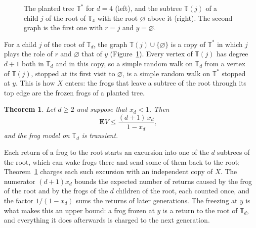 \documentclass[11pt]{amsart}
\newtheorem{theorem}{Theorem}[section]
\theoremstyle{definition}
\numberwithin{equation}{section}
\newcommand{\lean}[1]{\ignorespaces}
\newcommand{\T}{\mathbb{T}}
\newcommand{\Ts}{\mathbb{T}^{*}}
\newcommand{\E}{\mathbf{E}}
\begin{document}
\begin{figure}[ht]
\caption{The planted tree $\Ts$ for $d=4$ (left), and the subtree $\T(j)$ of a child $j$ of the root of $\T_4$ with the root $\varnothing$ above it (right). The second graph is the first one with $r=j$ and $y=\varnothing$.}\label{fig:planted}
\end{figure}

For a child $j$ of the root of $\T_d$, the graph $\T(j)\cup\{\varnothing\}$ is a copy of $\Ts$ in which $j$ plays the role of $r$ and $\varnothing$ that of $y$ (Figure~\ref{fig:planted}). Every vertex of $\T(j)$ has degree $d+1$ both in $\T_d$ and in this copy, so a simple random walk on $\T_d$ from a vertex of $\T(j)$, stopped at its first visit to $\varnothing$, is a simple random walk on $\Ts$ stopped at $y$. This is how $X$ enters: the frogs that leave a subtree of the root through its top edge are the frozen frogs of a planted tree.

\begin{theorem}\label{thm:A}\lean{FrogModel.theoremA, FrogModel.transient_of_meanX_lt_one, FrogModel.meanX, FrogModel.frozenCount}
Let $d\ge2$ and suppose that $x_d<1$. Then
\[
\E V\le \frac{(d+1)\,x_d}{1-x_d},
\]
and the frog model on $\T_d$ is transient.
\end{theorem}

Each return of a frog to the root starts an excursion into one of the $d$ subtrees of the root, which can wake frogs there and send some of them back to the root; Theorem~\ref{thm:A} charges each such excursion with an independent copy of $X$. The numerator $(d+1)x_d$ bounds the expected number of returns caused by the frog of the root and by the frogs of the $d$ children of the root, each counted once, and the factor $1/(1-x_d)$ sums the returns of later generations. The freezing at $y$ is what makes this an upper bound: a frog frozen at $y$ is a return to the root of $\T_d$, and everything it does afterwards is charged to the next generation.
\end{document}
